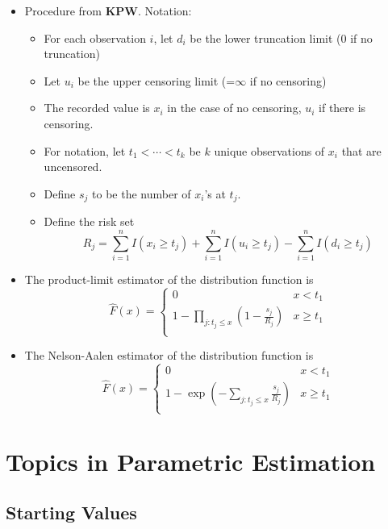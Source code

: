 \documentclass[]{book}
\begin{document}
\begin{itemize}
\item
  Procedure from \textbf{KPW}. Notation:

  \begin{itemize}
  \item
    For each observation \(i\), let \(d_i\) be the lower truncation
    limit (0 if no truncation)
  \item
    Let \(u_i\) be the upper censoring limit (=\(\infty\) if no
    censoring)
  \item
    The recorded value is \(x_i\) in the case of no censoring, \(u_i\)
    if there is censoring.
  \item
    For notation, let \(t_1 < \cdots < t_k\) be \(k\) unique
    observations of \(x_i\) that are uncensored.
  \item
    Define \(s_j\) to be the number of \(x_i\)'s at \(t_j\).
  \item
    Define the risk set
    \[R_j = \sum_{i=1}^n I(x_i \geq t_{j}) + \sum_{i=1}^n I(u_i \geq t_{j}) - \sum_{i=1}^n I(d_i \geq t_{j})\]
  \end{itemize}
\item
  The product-limit estimator of the distribution function is
  \[\hat{F}(x)=
  \left\lbrace
  \begin{array}{llll}
  0 &
  x < t_{1} \\
  1- \prod_{j:t_{j} \leq x}\left( 1-\frac{s_j}{R_{j}}\right)  &
  x \geq t_{1}\\
  \end{array}
  \right .\]
\item
  The Nelson-Aalen estimator of the distribution function is
  \[\hat{F}(x)=
  \left\lbrace
  \begin{array}{llll}
  0 &
  x < t_{1} \\
  1- \exp \left(-\sum_{j:t_{j} \leq x}\frac{s_j}{R_j} \right) &
  x \geq t_{1}\\
  \end{array}
  \right.\]
\end{itemize}

\section{Topics in Parametric
Estimation}\label{topics-in-parametric-estimation}

\subsection{Starting Values}\label{starting-values}
\end{document}
